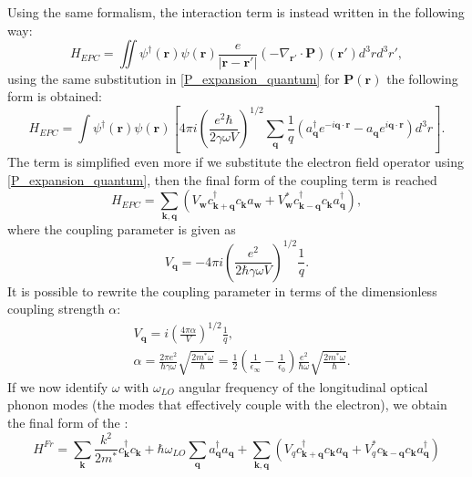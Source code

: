 Using the same formalism, the interaction term is instead written in the following way:
\begin{equation}
    H_{EPC}=\iint\psi^\dagger(\mathbf{r})\psi(\mathbf{r})\frac{e}{|\mathbf{r}-\mathbf{r}'|}(-\nabla_{\mathbf{r}'}\cdot\mathbf{P})(\mathbf{r}')d^3rd^3r',
\end{equation}
using the same substitution in \ref{P_expansion_quantum} for $\mathbf{P}(\mathbf{r})$ the following form is obtained:
\begin{equation}
    H_{EPC}=\int \psi^\dagger(\mathbf{r})\psi(\mathbf{r})\left[4\pi i \left(\frac{e^2\hbar}{2\gamma\omega V}\right)^{1/2}\sum_\mathbf{q}\frac{1}{q}(a^\dagger_\mathbf{q}e^{-i\mathbf{q}\cdot\mathbf{r}}-a_\mathbf{q}e^{i\mathbf{q}\cdot\mathbf{r}})d^3r\right].
\end{equation}
The term is simplified even more if we substitute the electron field operator using \ref{P_expansion_quantum}, then the final form of 
the coupling term is reached
\begin{equation}
    H_{EPC}=\sum_{\mathbf{k},\mathbf{q}}(V_\mathbf{w}c^\dagger_\mathbf{k+q}c_\mathbf{k}a_\mathbf{w}+V^*_\mathbf{w}c^\dagger_\mathbf{k-q}c_\mathbf{k}a^\dagger_\mathbf{q}),
\end{equation}
where the coupling parameter is given as 
\begin{equation}
    V_\mathbf{q}=-4\pi i\left(\frac{e^2}{2\hbar\gamma\omega V}\right)^{1/2}\frac{1}{q}.
\end{equation}
It is possible to rewrite the coupling parameter in terms of the dimensionless coupling strength $\alpha$:
\begin{equation}
\begin{split}
    &V_\mathbf{q}=i\left(\frac{4\pi\alpha}{V}\right)^{1/2}\frac{1}{q},\\
    &\alpha=\frac{2\pi e^2}{\hbar\gamma\omega}\sqrt{\frac{2m^*\omega}{\hbar}}=\frac{1}{2}\left(\frac{1}{\epsilon_\infty}-\frac{1}{\epsilon_0}\right)\frac{e^2}{\hbar\omega}\sqrt{\frac{2m^*\omega}{\hbar}}.
\end{split}
\end{equation}
If we now identify $\omega$ with $\omega_{LO}$ angular frequency of the longitudinal optical phonon modes (the modes that effectively 
couple with the electron), we obtain the final form of the :
\begin{equation}
    H^{Fr}=\sum_\mathbf{k}\frac{k^2}{2m^*}c^\dagger_{\mathbf{k}}c_\mathbf{k}+\hbar\omega_{LO}\sum_\mathbf{q}a^\dagger_\mathbf{q}a_\mathbf{q}+\sum_{\mathbf{k},\mathbf{q}}(V_qc^\dagger_{\mathbf{k}+\mathbf{q}}c_\mathbf{k}a_\mathbf{q}+V_q^*c_{\mathbf{k}-\mathbf{q}}c_\mathbf{k}a^\dagger_\mathbf{q})
    \label{Froehlich_Hamiltonian_second}
\end{equation}
